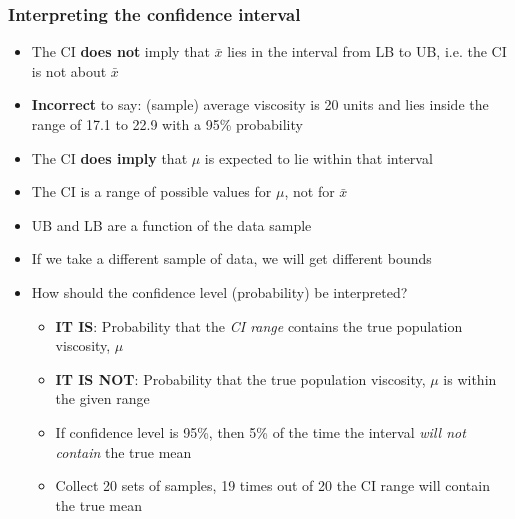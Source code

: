 \begin{frame}\frametitle{Interpreting the confidence interval}
	\begin{itemize}
		\item The CI \textbf{does not} imply that $\bar{x}$ lies in the interval from LB to UB, i.e. the CI is not about $\bar{x}$
		\item \textbf{Incorrect} to say: (sample) average viscosity is 20 units and lies inside the range of 17.1 to 22.9 with a 95\% probability \pause
		\item The CI \textbf{does imply} that $\mu$ is expected to lie within that interval
		\item The CI is a range of possible values for $\mu$, not for $\bar{x}$ \pause
		\item UB and LB are a function of the data sample
		\item If we take a different sample of data, we will get different bounds\pause
		\item How should the confidence level (probability) be interpreted?
		\begin{itemize}
			\item \textbf{IT IS}: Probability that the \emph{CI range} contains the true population viscosity, $\mu$
			\item \textbf{IT IS NOT}: Probability that the true population viscosity, $\mu$ is within the given range\pause
			\item If confidence level is 95\%, then 5\% of the time the interval \emph{will not contain} the true mean
			\item Collect 20 sets of samples, 19 times out of 20 the CI range will contain the true mean
		\end{itemize}
	\end{itemize}
\end{frame}

